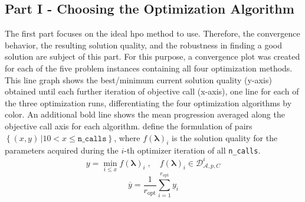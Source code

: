\subsection{Part I - Choosing the Optimization Algorithm}
\label{chap:an-part1}
The first part focuses on the ideal \gls{hpo} method to use. Therefore, the convergence behavior, the resulting solution quality, and the robustness in finding a good solution are subject of this part. For this purpose, a convergence plot was created for each of the five problem instances containing all four optimization methods. This line graph shows the best/minimum current solution quality (y-axis) obtained until each further iteration of objective call (x-axis), one line for each of the three optimization runs, differentiating the four optimization algorithms by color. An additional bold line shows the mean progression averaged along the objective call axis for each algorithm.  define the formulation of pairs $\left\lbrace (x,y) \, | 10 < x \leq \texttt{n\_calls} \right\rbrace $, where $f(\mathbf{\lambda})_i$ is the solution quality for the parameters acquired during the $i$-th optimizer iteration of all \texttt{n\_calls}.
\begin{equation}
	\label{eq:convergence-plot}
	y = \min_{i \leq x} f(\mathbf{\lambda})_i \; , \quad f(\mathbf{\lambda})_i \in \mathcal{D}^i_{\mathcal{A},p,C}
\end{equation}
\begin{equation}
	\label{eq:convergence-plot-mean}
	\overline{y} = \frac{1}{r_\text{opt}} \sum_{i=1}^{r_\text{opt}} y_i
\end{equation}


